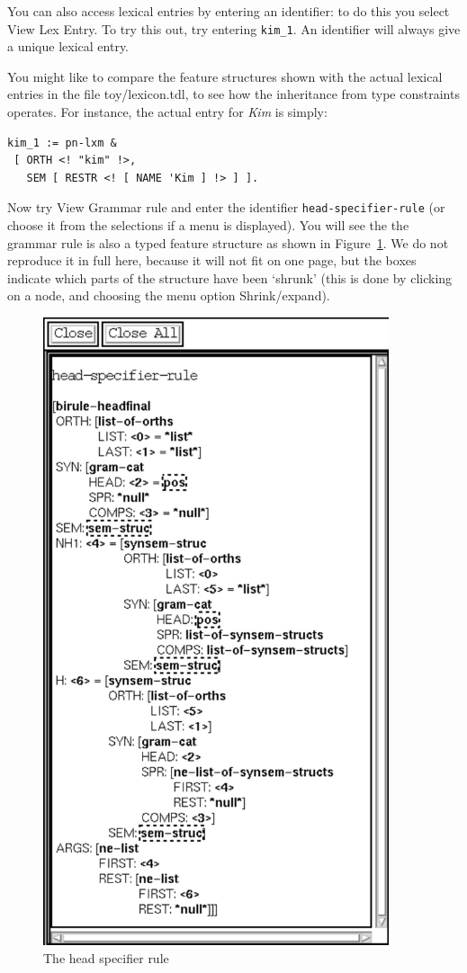 \documentclass[12pt]{report}
\newcommand{\lkbmenucommand}{{\bf}}
\begin{document}
You can also access lexical entries by entering an identifier: to
do this you select {\lkbmenucommand View} {\lkbmenucommand Lex Entry}.  
To try this out, try entering {\tt kim\_1}.
An identifier will always
give a unique lexical entry.  

You might like 
to compare the feature structures shown with the actual lexical
entries in the file toy/lexicon.tdl, to see how the inheritance from type
constraints operates.  For instance, the actual entry for {\it Kim} is
simply:
\begin{verbatim}
kim_1 := pn-lxm & 
 [ ORTH <! "kim" !>,
   SEM [ RESTR <! [ NAME 'Kim ] !> ] ].
\end{verbatim}

Now try {\lkbmenucommand View} {\lkbmenucommand Grammar rule} and 
enter the identifier
{\tt head-specifier-rule} (or choose
it from the selections if a 
menu is displayed).  You will see the the grammar rule
is also a typed feature structure as shown in Figure~\ref{rulefs}.
We do not reproduce it in full here, because
it will not fit on one page, but the boxes indicate which parts of the
structure have been `shrunk' (this is done by clicking on a node,
and choosing the menu option {\lkbmenucommand Shrink/expand}).
\begin{figure}
\includegraphics[width=4in]{figs/rulefs}
\caption{The head specifier rule}
\label{rulefs}
\end{figure}
\end{document}
